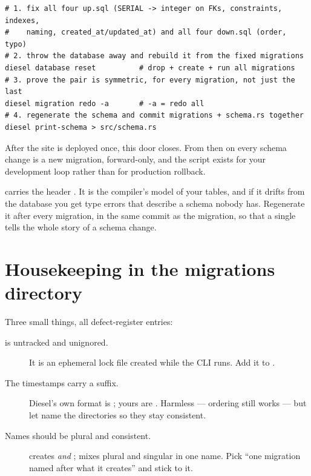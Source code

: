 \begin{pattern}
\begin{lstlisting}[style=sh]
# 1. fix all four up.sql (SERIAL -> integer on FKs, constraints, indexes,
#    naming, created_at/updated_at) and all four down.sql (order, typo)
# 2. throw the database away and rebuild it from the fixed migrations
diesel database reset          # drop + create + run all migrations
# 3. prove the pair is symmetric, for every migration, not just the last
diesel migration redo -a       # -a = redo all
# 4. regenerate the schema and commit migrations + schema.rs together
diesel print-schema > src/schema.rs
\end{lstlisting}
After the site is deployed once, this door closes. From then on every schema change is a new
migration, forward-only, and the  script exists for your development loop rather than
for production rollback.
\end{pattern}

\begin{pitfall}
 carries the header
. It is the compiler's model of your tables, and
if it drifts from the database you get type errors that describe a schema nobody has. Regenerate it
after every migration, in the same commit as the migration, so that a single 
tells the whole story of a schema change.
\end{pitfall}

\section{Housekeeping in the migrations directory}

Three small things, all defect-register entries:

\begin{description}
  \item[ is untracked and unignored.] It is an ephemeral lock file
    created while the CLI runs. Add it to . 

  \item[The timestamps carry a  suffix.] Diesel's own format is
    ; yours are .
    Harmless --- ordering still works --- but let  name the
    directories so they stay consistent. 

  \item[Names should be plural and consistent.]  creates
     \emph{and} ;  mixes plural
    and singular in one name. Pick ``one migration named after what it creates'' and stick to it. 
\end{description}


